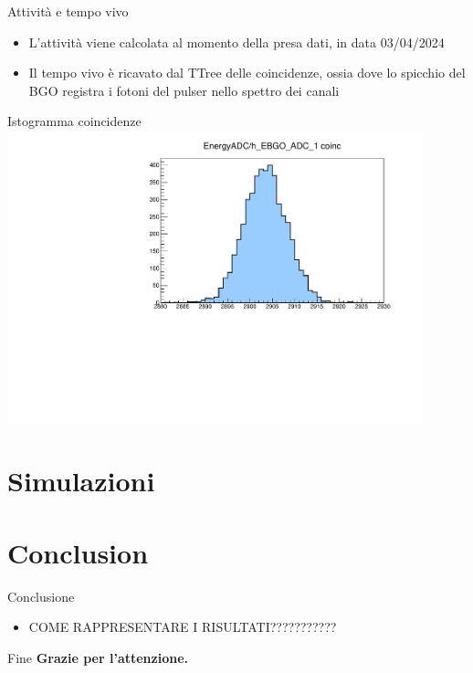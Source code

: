 \documentclass [xcolor=svgnames] {beamer}
\begin{document}
\begin{frame}{Attività e tempo vivo}
	\begin{itemize}
		\item L'attività viene calcolata al momento della presa dati, in data 03/04/2024
		\item Il tempo vivo è ricavato dal TTree delle coincidenze, ossia dove lo spicchio del BGO registra i fotoni del pulser nello spettro dei canali
	\end{itemize}
\end{frame}
\begin{frame}{Istogramma coincidenze}
	\centering
	\includegraphics[width=0.9\textwidth]{img/run1776_coinc_h_EBGO_ADC_1_COINC.pdf}
\end{frame}


\section{Simulazioni}

	
	\section{Conclusion}
	\begin{frame}{Conclusione}
		\begin{itemize}
			\item COME RAPPRESENTARE I RISULTATI???????????
		\end{itemize}
	\end{frame}
	
	\begin{frame}{Fine}
		\centering
		\textbf{Grazie per l'attenzione.}
	\end{frame}
	
\end{document}
